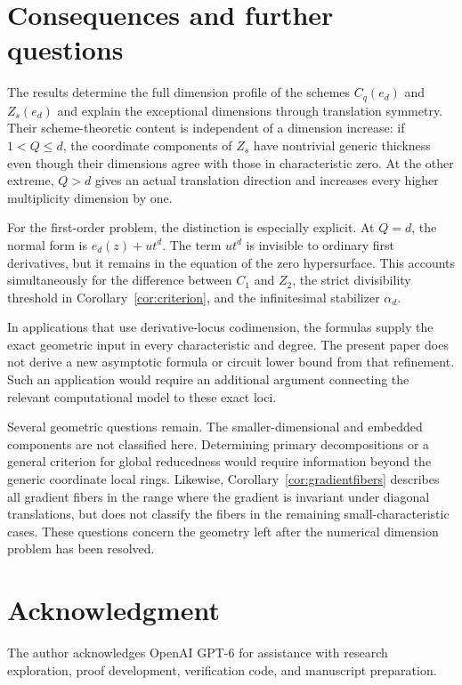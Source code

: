 \documentclass[11pt]{article}
\theoremstyle{remark}
\begin{document}
\section{Consequences and further questions}

The results determine the full dimension profile of the schemes
$C_q(e_d)$ and $Z_s(e_d)$ and explain the exceptional dimensions
through translation symmetry. Their scheme-theoretic content is
independent of a dimension increase: if $1<Q\le d$, the coordinate
components of $Z_s$ have nontrivial generic thickness even though
their dimensions agree with those in characteristic zero. At the
other extreme, $Q>d$ gives an actual translation direction and
increases every higher multiplicity dimension by one.

For the first-order problem, the distinction is especially explicit.
At $Q=d$, the normal form is $e_d(z)+ut^d$. The term $ut^d$ is
invisible to ordinary first derivatives, but it remains in the
equation of the zero hypersurface. This accounts simultaneously
for the difference between $C_1$ and $Z_2$, the strict divisibility
threshold in Corollary~\ref{cor:criterion}, and the infinitesimal
stabilizer $\alpha_d$.

In applications that use derivative-locus codimension, the formulas
supply the exact geometric input in every characteristic and degree.
The present paper does not derive a new asymptotic formula or circuit
lower bound from that refinement. Such an application would require
an additional argument connecting the relevant computational model
to these exact loci.

Several geometric questions remain. The smaller-dimensional and
embedded components are not classified here. Determining primary
decompositions or a general criterion for global reducedness would
require information beyond the generic coordinate local rings.
Likewise, Corollary~\ref{cor:gradientfibers} describes all gradient
fibers in the range where the gradient is invariant under diagonal
translations, but does not classify the fibers in the remaining
small-characteristic cases. These
questions concern the geometry left after the numerical dimension
problem has been resolved.

\section*{Acknowledgment}
The author acknowledges OpenAI GPT-6 for assistance with research exploration,
proof development, verification code, and manuscript preparation.
\end{document}
